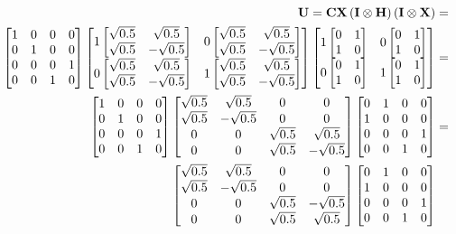 \begin{figure}[H]
    \centering
    \begin{align*}
        \mathbf{U}=\qtcx  \left(\qti\otimes\qth\right) \left(\qti\otimes\qtx\right)&=\\
        \qcx  
        \begin{bmatrix}
            1\qh & 0\qh \\
            0\qh & 1\qh \\
        \end{bmatrix}
        \begin{bmatrix}
            1\qx & 0\qx \\
            0\qx & 1\qx \\
        \end{bmatrix}
        &=\\
        \qcx  
        \begin{bmatrix}
            \sqrt{0.5} &  \sqrt{0.5} & 0 & 0 \\
            \sqrt{0.5} & -\sqrt{0.5} & 0 & 0 \\
            0 & 0 & \sqrt{0.5} &  \sqrt{0.5} \\
            0 & 0 & \sqrt{0.5} & -\sqrt{0.5} \\
        \end{bmatrix}
        \begin{bmatrix}
            0 & 1 & 0 & 0 \\
            1 & 0 & 0 & 0 \\
            0 & 0 & 0 & 1 \\
            0 & 0 & 1 & 0 \\
        \end{bmatrix}
        &=\\
        \begin{bmatrix}
            \sqrt{0.5} &  \sqrt{0.5} & 0 & 0 \\
            \sqrt{0.5} & -\sqrt{0.5} & 0 & 0 \\
            0 & 0 & \sqrt{0.5} & -\sqrt{0.5} \\
            0 & 0 & \sqrt{0.5} &  \sqrt{0.5} \\
        \end{bmatrix}
        \begin{bmatrix}
            0 & 1 & 0 & 0 \\
            1 & 0 & 0 & 0 \\
            0 & 0 & 0 & 1 \\
            0 & 0 & 1 & 0 \\

\end{bmatrix}
\end{align*}
\end{figure}
